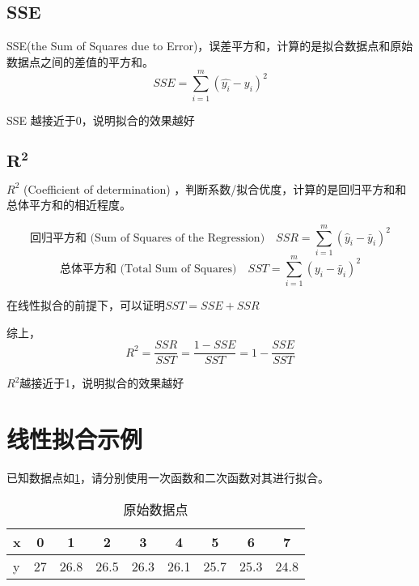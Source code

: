 \documentclass[withoutpreface]{cumcmthesis}
\begin{document}
\subsection{SSE}

SSE(the Sum of Squares due to Error)，误差平方和，计算的是拟合数据点和原始数据点之间的差值的平方和。
\begin{equation}
    SSE = \sum\limits_{i=1}^{m} (\hat {y_i} - y_i)^2 
\end{equation}

SSE 越接近于0，说明拟合的效果越好

\subsection{\texorpdfstring{$\mathbf{R^2}$}{}}

$R^2$ (Coefficient of determination) ，判断系数/拟合优度，计算的是回归平方和和总体平方和的相近程度。

\begin{equation}
    \mbox{回归平方和 (Sum of Squares of the Regression)}\quad SSR=\sum\limits_{i=1}^{m} (\hat y_i - \bar y_i)^2
\end{equation}
\begin{equation}
    \mbox{总体平方和 (Total Sum of Squares)}\quad SST=\sum\limits_{i=1}^{m} (y_i - \bar y_i)^2
\end{equation}

在线性拟合的前提下，可以证明$SST = SSE  + SSR$

综上，
\begin{equation}
    R^2 = \frac{SSR}{SST}=\frac{1-SSE}{SST} = 1-\frac{SSE}{SST}
\end{equation}

$R^2$越接近于1，说明拟合的效果越好

\section{线性拟合示例}

已知数据点如\cref{Tab:1}，请分别使用一次函数和二次函数对其进行拟合。

\begin{table}[H]
    \centering
    \caption{原始数据点}\label{Tab:1}
    \begin{tabular}{|l|c|c|c|c|c|c|c|c|}
        \hline
        x & 0 & 1& 2& 3& 4& 5& 6& 7 \\ 
        \hline
        y & 27 & 26.8 & 26.5 & 26.3 & 26.1 & 25.7 & 25.3 & 24.8 \\
        \hline
    \end{tabular}
\end{table}
\end{document}
